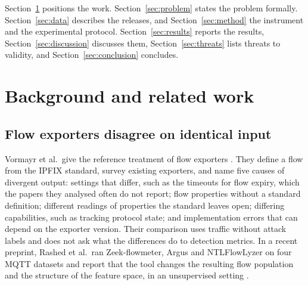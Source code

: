 \documentclass[pdflatex,sn-mathphys-num]{sn-jnl}
\theoremstyle{thmstyleone}%
\theoremstyle{thmstylethree}%
\begin{document}
Section~\ref{sec:related} positions the work. Section~\ref{sec:problem} states the problem formally. Section~\ref{sec:data} describes the releases, and Section~\ref{sec:method} the instrument and the experimental protocol. Section~\ref{sec:results} reports the results, Section~\ref{sec:discussion} discusses them, Section~\ref{sec:threats} lists threats to validity, and Section~\ref{sec:conclusion} concludes.

\section{Background and related work}\label{sec:related}

\subsection{Flow exporters disagree on identical input}

Vormayr et al.\ give the reference treatment of flow exporters \cite{vormayr2020}. They define a flow from the IPFIX standard, survey existing exporters, and name five causes of divergent output: settings that differ, such as the timeouts for flow expiry, which the papers they analysed often do not report; flow properties without a standard definition; different readings of properties the standard leaves open; differing capabilities, such as tracking protocol state; and implementation errors that can depend on the exporter version. Their comparison uses traffic without attack labels and does not ask what the differences do to detection metrics. In a recent preprint, Rashed et al.\ ran Zeek-flowmeter, Argus and NTLFlowLyzer on four MQTT datasets and report that the tool changes the resulting flow population and the structure of the feature space, in an unsupervised setting \cite{rashed2026}.
\end{document}
